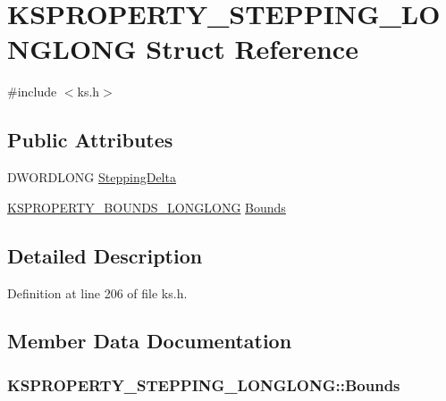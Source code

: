 \hypertarget{struct_k_s_p_r_o_p_e_r_t_y___s_t_e_p_p_i_n_g___l_o_n_g_l_o_n_g}{}\section{K\+S\+P\+R\+O\+P\+E\+R\+T\+Y\+\_\+\+S\+T\+E\+P\+P\+I\+N\+G\+\_\+\+L\+O\+N\+G\+L\+O\+NG Struct Reference}
\label{struct_k_s_p_r_o_p_e_r_t_y___s_t_e_p_p_i_n_g___l_o_n_g_l_o_n_g}


{\ttfamily \#include $<$ks.\+h$>$}

\subsection*{Public Attributes}
\begin{DoxyCompactItemize}
\item 
D\+W\+O\+R\+D\+L\+O\+NG \hyperlink{struct_k_s_p_r_o_p_e_r_t_y___s_t_e_p_p_i_n_g___l_o_n_g_l_o_n_g_a9f5d9e76c5beb4077bc5d78deb5cdcc0}{Stepping\+Delta}
\item 
\hyperlink{union_k_s_p_r_o_p_e_r_t_y___b_o_u_n_d_s___l_o_n_g_l_o_n_g}{K\+S\+P\+R\+O\+P\+E\+R\+T\+Y\+\_\+\+B\+O\+U\+N\+D\+S\+\_\+\+L\+O\+N\+G\+L\+O\+NG} \hyperlink{struct_k_s_p_r_o_p_e_r_t_y___s_t_e_p_p_i_n_g___l_o_n_g_l_o_n_g_acc7cf8a3b634d886249edc1c15a08273}{Bounds}
\end{DoxyCompactItemize}


\subsection{Detailed Description}


Definition at line 206 of file ks.\+h.



\subsection{Member Data Documentation}
\subsubsection[{\texorpdfstring{Bounds}{Bounds}}]{ K\+S\+P\+R\+O\+P\+E\+R\+T\+Y\+\_\+\+S\+T\+E\+P\+P\+I\+N\+G\+\_\+\+L\+O\+N\+G\+L\+O\+N\+G\+::\+Bounds}\hypertarget{struct_k_s_p_r_o_p_e_r_t_y___s_t_e_p_p_i_n_g___l_o_n_g_l_o_n_g_acc7cf8a3b634d886249edc1c15a08273}{}\label{struct_k_s_p_r_o_p_e_r_t_y___s_t_e_p_p_i_n_g___l_o_n_g_l_o_n_g_acc7cf8a3b634d886249edc1c15a08273}



